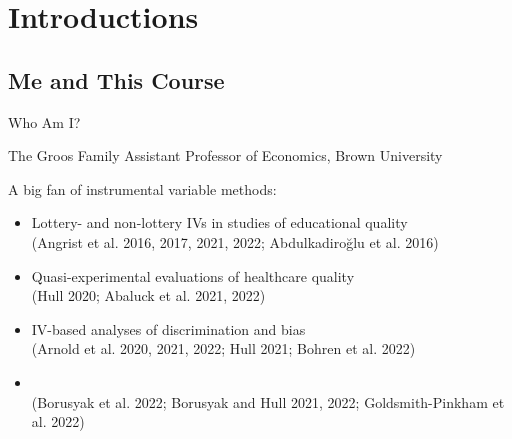 \documentclass[t]{beamer}
\begin{document}
\setlength{\abovedisplayskip}{5pt}
\setlength{\belowdisplayskip}{5pt}
\setlength{\abovedisplayshortskip}{5pt}
\setlength{\belowdisplayshortskip}{5pt}


\section{Introductions}

\subsection{Me and This Course}
\begin{frame}{Who Am I?}

The Groos Family Assistant Professor of Economics, Brown University\pause

A big fan of instrumental variable methods:\pause
\begin{itemize}
  \item Lottery- and non-lottery IVs in studies of educational quality \\ {\scriptsize \textcolor{red!75!green!50!blue!25!gray}{(Angrist et al. 2016, 2017, 2021, 2022; Abdulkadiro\u{g}lu et al. 2016)}}
  \item Quasi-experimental evaluations of healthcare quality \\ {\scriptsize \textcolor{red!75!green!50!blue!25!gray}{(Hull 2020; Abaluck et al. 2021, 2022)}}
  \item IV-based analyses of discrimination and bias \\ {\scriptsize \textcolor{red!75!green!50!blue!25!gray}{(Arnold et al. 2020, 2021, 2022; Hull 2021; Bohren et al. 2022)}}

  \item {} \\ {\scriptsize \textcolor{red!75!green!50!blue!25!gray}{(Borusyak et al. 2022; Borusyak and Hull 2021, 2022; Goldsmith-Pinkham et al. 2022)}}
\end{itemize}

\end{frame}
\end{document}
